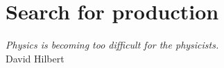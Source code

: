 \chapter{Search for  production}
\label{chp:ttH}

\begin{flushright}

\emph{ Physics is becoming too difficult for the physicists.}\\
David Hilbert
\end{flushright}

\minitoc









